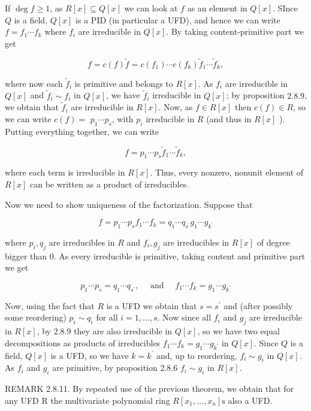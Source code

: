 If $\operatorname{deg} f \geq 1$, as $R[x] \subseteq Q[x]$ we can look at $f$ as an element in $Q[x]$. SInce $Q$ is a field, $Q[x]$ is a PID (in particular a UFD), and hence we can write $f=f_{1} \cdots f_{k}$ where $f_{i}$ are irreducible in $Q[x]$. By taking content-primitive part we get

$$
f=c(f) \tilde{f}=c\left(f_{1}\right) \cdots c\left(f_{k}\right) \tilde{f}_{1} \cdots \tilde{f}_{k},
$$

where now each $\tilde{f}_{i}$ is primitive and belongs to $R[x]$. As $f_{i}$ are irreducible in $Q[x]$ and $\tilde{f}_{i} \sim f_{i}$ in $Q[x]$, we have $\tilde{f}_{i}$ irreducible in $Q[x]$; by proposition $2.8 .9$, we obtain that $\tilde{f}_{i}$ are irreducible in $R[x]$. Now, as $f \in R[x]$ then $c(f) \in R$, so we can write $c(f)=$ $p_{1} \cdots p_{s}$, with $p_{i}$ irreducible in $R$ (and thus in $R[x]$ ). Putting everything together, we can write

$$
f=p_{1} \cdots p_{s} \tilde{f}_{1} \cdots \tilde{f}_{k},
$$

where each term is irreducible in $R[x]$. Thus, every nonzero, nonunit element of $R[x]$ can be written as a product of irreducibles.

Now we need to show uniqueness of the factorization. Suppose that

$$
f=p_{1} \cdots p_{s} f_{1} \cdots f_{k}=q_{1} \cdots q_{s^{\prime}} g_{1} \cdots g_{k^{\prime}}
$$

where $p_{i}, q_{j}$ are irreducibles in $R$ and $f_{i}, g_{j}$ are irreducibles in $R[x]$ of degree bigger than 0. As every irreducible is primitive, taking content and primitive part we get

$$
p_{1} \cdots p_{s}=q_{1} \cdots q_{s^{\prime}}, \quad \text { and } \quad f_{1} \cdots f_{k}=g_{1} \cdots g_{k^{\prime}}
$$

Now, using the fact that $R$ is a UFD we obtain that $s=s^{\prime}$ and (after possibly some reordering) $p_{i} \sim q_{i}$ for all $i=1, \ldots, s$. Now since all $f_{i}$ and $g_{j}$ are irreducible in $R[x]$, by $2.8 .9$ they are also irreducible in $Q[x]$, so we have two equal decompositions as products of irreducibles $f_{1} \cdots f_{k}=g_{1} \cdots g_{k^{\prime}}$ in $Q[x]$. Since $Q$ is a field, $Q[x]$ is a UFD, so we have $k=k^{\prime}$ and, up to reordering, $f_{i} \sim g_{i}$ in $Q[x]$. As $f_{i}$ and $g_{i}$ are primitive, by proposition 2.8.6 $f_{i} \sim g_{i}$ in $R[x]$.

REMARK 2.8.11. By repeated use of the previous theorem, we obtain that for any UFD $\mathrm{R}$ the multivariate polynomial ring $R\left[x_{1}, \ldots, x_{n}\right] \mathrm{s}$ also a UFD.

